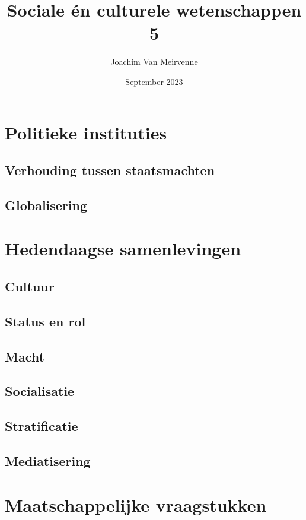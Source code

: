 \documentclass[a4paper,12pt, dutch, oneside ]{book}
\begin{document}
\author{Joachim Van Meirvenne}
\title{Sociale \'en culturele wetenschappen 5}
\date{September 2023}



\part{Politieke instituties}


\chapter{Verhouding tussen staatsmachten}
\chapter{Globalisering}

\part{Hedendaagse samenlevingen}
\chapter{Cultuur}
\chapter{Status en rol}
\chapter{Macht}
\chapter{Socialisatie}
\chapter{Stratificatie}
\chapter{Mediatisering}

\part{Maatschappelijke vraagstukken}

%


\end{document}
